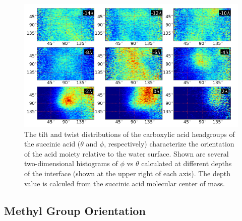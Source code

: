 \begin{figure}[h!]
	\begin{center}
		\includegraphics[scale=1.0]{images/bond-angles/carbonyl-theta-phi.png}
		\caption{The tilt and twist distributions of the carboxylic acid headgroups of the succinic acid ($\theta$ and $\phi$, respectively) characterize the orientation of the acid moiety relative to the water surface. Shown are several two-dimensional histograms of $\phi$ vs $\theta$ calculated at different depths of the interface (shown at the upper right of each axis). The depth value is calculed from the succinic acid molecular center of mass.} 
		\label{fig:carbonyl-theta-phi}
	\end{center}
\end{figure}


\subsection* {Methyl Group Orientation}

